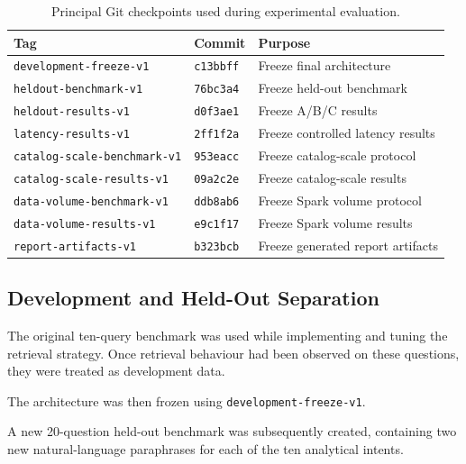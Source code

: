 \begin{table}[htbp]
\centering
\small
\begin{tabular}{lll}
\toprule
Tag & Commit & Purpose \\
\midrule
\texttt{development-freeze-v1}
& \texttt{c13bbff}
& Freeze final architecture \\

\texttt{heldout-benchmark-v1}
& \texttt{76bc3a4}
& Freeze held-out benchmark \\

\texttt{heldout-results-v1}
& \texttt{d0f3ae1}
& Freeze A/B/C results \\

\texttt{latency-results-v1}
& \texttt{2ff1f2a}
& Freeze controlled latency results \\

\texttt{catalog-scale-benchmark-v1}
& \texttt{953eacc}
& Freeze catalog-scale protocol \\

\texttt{catalog-scale-results-v1}
& \texttt{09a2c2e}
& Freeze catalog-scale results \\

\texttt{data-volume-benchmark-v1}
& \texttt{ddb8ab6}
& Freeze Spark volume protocol \\

\texttt{data-volume-results-v1}
& \texttt{e9c1f17}
& Freeze Spark volume results \\

\texttt{report-artifacts-v1}
& \texttt{b323bcb}
& Freeze generated report artifacts \\
\bottomrule
\end{tabular}
\caption{Principal Git checkpoints used during experimental evaluation.}
\label{tab:freeze-chain}
\end{table}


\subsection{Development and Held-Out Separation}

The original ten-query benchmark was used while implementing and tuning the
retrieval strategy. Once retrieval behaviour had been observed on these
questions, they were treated as development data.

The architecture was then frozen using
\texttt{development-freeze-v1}.

A new 20-question held-out benchmark was subsequently created, containing two
new natural-language paraphrases for each of the ten analytical intents.

